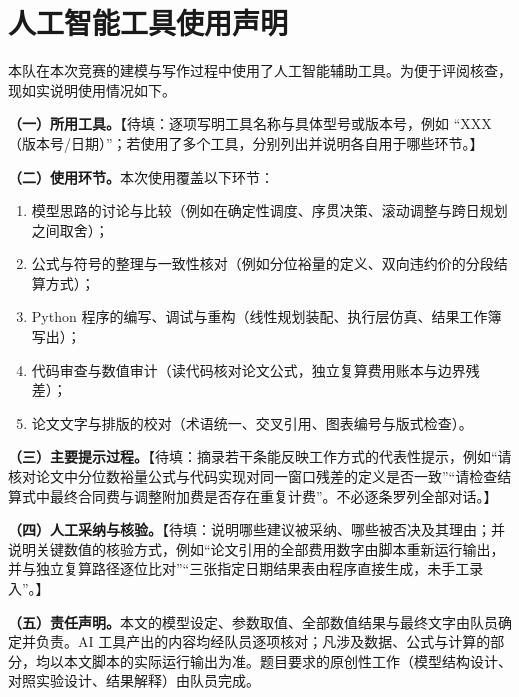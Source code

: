 
\section*{人工智能工具使用声明}

本队在本次竞赛的建模与写作过程中使用了人工智能辅助工具。为便于评阅核查，现如实说明使用情况如下。

\textbf{（一）所用工具。}【待填：逐项写明工具名称与具体型号或版本号，例如 ``XXX（版本号/日期）''；若使用了多个工具，分别列出并说明各自用于哪些环节。】

\textbf{（二）使用环节。}本次使用覆盖以下环节：
\begin{enumerate}
  \item 模型思路的讨论与比较（例如在确定性调度、序贯决策、滚动调整与跨日规划之间取舍）；
  \item 公式与符号的整理与一致性核对（例如分位裕量的定义、双向违约价的分段结算方式）；
  \item Python 程序的编写、调试与重构（线性规划装配、执行层仿真、结果工作簿写出）；
  \item 代码审查与数值审计（读代码核对论文公式，独立复算费用账本与边界残差）；
  \item 论文文字与排版的校对（术语统一、交叉引用、图表编号与版式检查）。
\end{enumerate}

\textbf{（三）主要提示过程。}【待填：摘录若干条能反映工作方式的代表性提示，例如``请核对论文中分位数裕量公式与代码实现对同一窗口残差的定义是否一致''``请检查结算式中最终合同费与调整附加费是否存在重复计费''。不必逐条罗列全部对话。】

\textbf{（四）人工采纳与核验。}【待填：说明哪些建议被采纳、哪些被否决及其理由；并说明关键数值的核验方式，例如``论文引用的全部费用数字由脚本重新运行输出，并与独立复算路径逐位比对''``三张指定日期结果表由程序直接生成，未手工录入''。】

\textbf{（五）责任声明。}本文的模型设定、参数取值、全部数值结果与最终文字由队员确定并负责。AI 工具产出的内容均经队员逐项核对；凡涉及数据、公式与计算的部分，均以本文脚本的实际运行输出为准。题目要求的原创性工作（模型结构设计、对照实验设计、结果解释）由队员完成。
